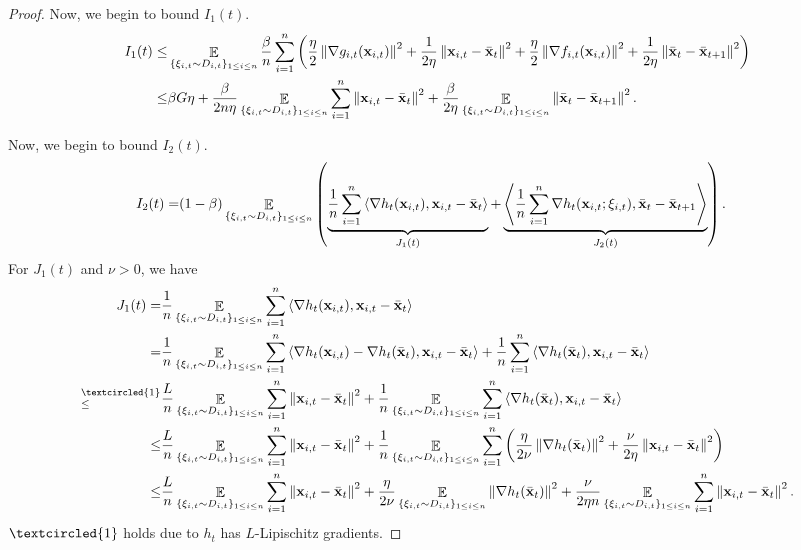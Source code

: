 \documentclass{article}
\begin{document}
\begin{proof}
Now, we begin to bound $I_1(t)$.
\begin{align}
\nonumber
I_1(t) \le & \mathop{\mathbb{E}}_{ \{\xi_{i,t} \sim D_{i,t}\}_{1\le i \le n} }\frac{\beta}{n}\sum_{i=1}^n \left(  \frac{\eta}{2}\left\lVert\nabla g_{i,t}({\bf x}_{i,t})\right\rVert^2 + \frac{1}{2\eta}\left\lVert{\bf x}_{i,t} - \bar{{\bf x}}_t\right\rVert^2  + \frac{\eta}{2}\left\lVert\nabla f_{i,t}({\bf x}_{i,t})\right\rVert^2 + \frac{1}{2\eta}\left\lVert\bar{{\bf x}}_t - \bar{{\bf x}}_{t+1}\right\rVert^2  \right)\\ \nonumber
\le & \beta G \eta + \frac{\beta}{2n\eta } \mathop{\mathbb{E}}_{ \{\xi_{i,t} \sim D_{i,t}\}_{1\le i \le n} } \sum_{i=1}^n \left\lVert{\bf x}_{i,t} - \bar{{\bf x}}_t\right\rVert^2 + \frac{\beta }{2\eta }\mathop{\mathbb{E}}_{ \{\xi_{i,t} \sim D_{i,t}\}_{1\le i \le n} } \left\lVert\bar{{\bf x}}_t - \bar{{\bf x}}_{t+1}\right\rVert^2.
\end{align}

Now, we begin to bound $I_2(t)$.
\begin{align}
\nonumber
I_2(t) = & (1-\beta) \mathop{\mathbb{E}}_{ \{\xi_{i,t} \sim D_{i,t}\}_{1\le i \le n} } \left( \underbrace{ \frac{1}{n}\sum_{i=1}^n\left\langle\nabla h_t({\bf x}_{i,t}), {\bf x}_{i,t} - \bar{{\bf x}}_t  \right\rangle }_{J_1(t)} +  \underbrace{ \left\langle\frac{1}{n}\sum_{i=1}^n \nabla h_t({\bf x}_{i,t};\xi_{i,t}), \bar{{\bf x}}_t - \bar{{\bf x}}_{t+1}  \right\rangle}_{J_2(t)} \right).
\end{align} For $J_1(t)$ and $\nu>0$, we have
\begin{align}
\nonumber
J_1(t) = & \frac{1}{n}\EE_{ \{\xi_{i,t} \sim D_{i,t}\}_{1\le i \le n} }\sum_{i=1}^n\lrangle{\nabla h_t(\x_{i,t}), \x_{i,t} - \bar{\x}_t } \\ \nonumber
= & \frac{1}{n}\EE_{ \{\xi_{i,t} \sim D_{i,t}\}_{1\le i \le n} }\sum_{i=1}^n\lrangle{\nabla h_t(\x_{i,t}) - \nabla h_t(\bar{\x}_t), \x_{i,t} - \bar{\x}_t } + \frac{1}{n}\sum_{i=1}^n\lrangle{\nabla h_t(\bar{\x}_t), \x_{i,t} - \bar{\x}_t } \\ \nonumber
\refabovecir{\le}{\textcircled{1}} & \frac{L}{n}\EE_{ \{\xi_{i,t} \sim D_{i,t}\}_{1\le i \le n} }\sum_{i=1}^n \lrnorm{\x_{i,t} - \bar{\x}_t}^2 + \frac{1}{n}\EE_{ \{\xi_{i,t} \sim D_{i,t}\}_{1\le i \le n} }\sum_{i=1}^n\lrangle{\nabla h_t(\bar{\x}_t), \x_{i,t} - \bar{\x}_t } \\ \nonumber
\le & \frac{L}{n}\EE_{ \{\xi_{i,t} \sim D_{i,t}\}_{1\le i \le n} }\sum_{i=1}^n \lrnorm{\x_{i,t} - \bar{\x}_t}^2 + \frac{1}{n}\EE_{ \{\xi_{i,t} \sim D_{i,t}\}_{1\le i \le n} }\sum_{i=1}^n\lrincir{\frac{\eta}{2\nu}\lrnorm{\nabla h_t(\bar{\x}_t)}^2 + \frac{\nu}{2\eta}\lrnorm{\x_{i,t} - \bar{\x}_t }^2 } \\ \label{equa_theorem_temp0}
\le & \frac{L}{n}\EE_{ \{\xi_{i,t} \sim D_{i,t}\}_{1\le i \le n} }\sum_{i=1}^n \lrnorm{\x_{i,t} - \bar{\x}_t}^2 + \frac{\eta}{2\nu}\EE_{ \{\xi_{i,t} \sim D_{i,t}\}_{1\le i \le n} }\lrnorm{\nabla h_t(\bar{\x}_t)}^2 + \frac{\nu}{2\eta n}\EE_{ \{\xi_{i,t} \sim D_{i,t}\}_{1\le i \le n} }\sum_{i=1}^n\lrnorm{\x_{i,t} - \bar{\x}_t }^2. 
\end{align} $\textcircled{1}$ holds due to $h_t$ has $L$-Lipischitz gradients.



\end{proof}
\end{document}
